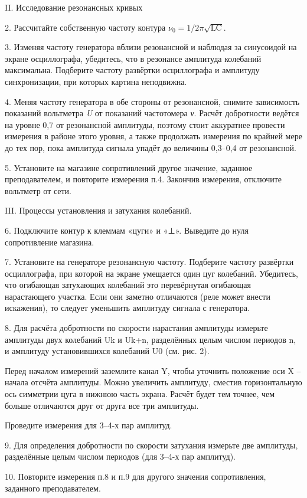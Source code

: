 II. Исследование резонансных кривых

2. Рассчитайте собственную частоту контура
\(\nu_{0} = 1/2\pi\sqrt{\text{LC}}\).

3. Изменяя частоту генератора вблизи резонансной и наблюдая за
синусоидой на экране осциллографа, убедитесь, что в резонансе амплитуда
колебаний максимальна. Подберите частоту развёртки осциллографа и
амплитуду синхронизации, при которых картина неподвижна.

4. Меняя частоту генератора в обе стороны от резонансной, снимите
зависимость показаний вольтметра \emph{U} от показаний частотомера
\emph{ν}. Расчёт добротности ведётся на уровне 0,7 от резонансной
амплитуды, поэтому стоит аккуратнее провести измерения в районе этого
уровня, а также продолжать измерения по крайней мере до тех пор, пока
амплитуда сигнала упадёт до величины 0,3--0,4 от резонансной.

5. Установите на магазине сопротивлений другое значение, заданное
преподавателем, и повторите измерения п.4. Закончив измерения, отключите
вольтметр от сети.

III. Процессы установления и затухания колебаний.

6. Подключите контур к клеммам «цуги» и «⊥». Выведите до нуля
сопротивление магазина.

7. Установите на генераторе резонансную частоту. Подберите частоту
развёртки осциллографа, при которой на экране умещается один цуг
колебаний. Убедитесь, что огибающая затухающих колебаний это
перевёрнутая огибающая нарастающего участка. Если они заметно отличаются
(реле может внести искажения), то следует уменьшить амплитуду сигнала с
генератора.

8. Для расчёта добротности по скорости нарастания амплитуды измерьте
амплитуды двух колебаний Uk и Uk+n, разделённых целым числом периодов n,
и амплитуду установившихся колебаний U0 (см. рис. 2).

Перед началом измерений заземлите канал Y, чтобы уточнить положение оси
X -- начала отсчёта амплитуды. Можно увеличить амплитуду, сместив
горизонтальную ось симметрии цуга в нижнюю часть экрана. Расчёт будет
тем точнее, чем больше отличаются друг от друга все три амплитуды.

Проведите измерения для 3--4-х пар амплитуд.

9. Для определения добротности по скорости затухания измерьте две
амплитуды, разделённые целым числом периодов (для 3--4-х пар амплитуд).

10. Повторите измерения п.8 и п.9 для другого значения сопротивления,
заданного преподавателем.

